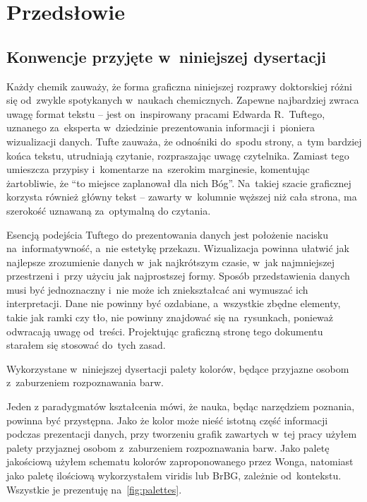 \chapter{Przedsłowie}\label{chapter:intro}

\section{Konwencje przyjęte w~niniejszej dysertacji}\label{intro:conventions}

Każdy chemik zauważy, że forma graficzna niniejszej rozprawy doktorskiej różni się
  od~zwykle spotykanych w~naukach chemicznych.
Zapewne najbardziej zwraca uwagę format tekstu \--- 
  jest on~inspirowany pracami Edwarda R.~Tuftego,
  uznanego za~eksperta w~dziedzinie prezentowania informacji i~pioniera wizualizacji
  danych.
Tufte zauważa, że odnośniki do~spodu strony, a~tym bardziej końca tekstu,
  utrudniają czytanie, rozpraszając uwagę czytelnika.
Zamiast tego umieszcza przypisy i~komentarze na~szerokim marginesie,
  komentując żartobliwie, że \enquote{to miejsce zaplanował dla nich Bóg}.
Na~takiej szacie graficznej korzysta również główny tekst \---
  zawarty w~kolumnie węższej niż cała strona, ma szerokość uznawaną za~optymalną
  do czytania.

Esencją podejścia Tuftego do prezentowania danych jest położenie nacisku
  na~informatywność, a~nie estetykę przekazu.
Wizualizacja powinna ułatwić jak najlepsze zrozumienie danych w~jak najkrótszym czasie,
  w~jak najmniejszej przestrzeni i~przy użyciu jak najprostszej formy.
Sposób przedstawienia danych musi być jednoznaczny i~nie może ich zniekształcać
  ani wymuszać ich interpretacji.
Dane nie powinny być ozdabiane, a~wszystkie zbędne elementy, takie jak ramki czy tło,
  nie powinny znajdować się na~rysunkach, ponieważ odwracają uwagę od~treści.
Projektując graficzną stronę tego dokumentu starałem się stosować do~tych zasad.

\begin{marginfigure}
  
  \caption{
    Wykorzystane w~niniejszej dysertacji palety kolorów,
    będące przyjazne osobom z~zaburzeniem rozpoznawania barw.
  }
  \label{fig:palettes}
\end{marginfigure}
Jeden z paradygmatów kształcenia mówi, że nauka, będąc narzędziem poznania,
  powinna być przystępna.
Jako że kolor może nieść istotną część informacji podczas prezentacji danych,
  przy tworzeniu grafik zawartych w~tej pracy użyłem palety przyjaznej osobom
  z~zaburzeniem rozpoznawania barw.
Jako paletę jakościową użyłem schematu kolorów zaproponowanego przez Wonga,
  natomiast jako paletę ilościową wykorzystałem viridis lub BrBG,
  zależnie od~kontekstu.
Wszystkie je prezentuję na~\cref{fig:palettes}.

